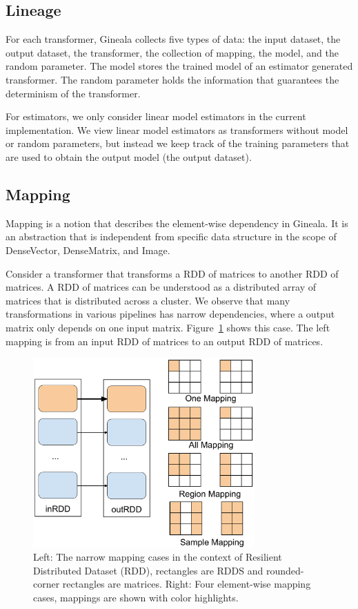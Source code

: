 \documentclass{sig-alternate}
\begin{document}
\subsection{Lineage}
\label{sec:Design-Lineage}
For each transformer, Gineala collects five types of data: the input dataset, the output dataset, the transformer, the collection of mapping, the model, and the random parameter.
The model stores the trained model of an estimator generated transformer.
The random parameter holds the information that guarantees the determinism of the transformer.

For estimators, we only consider linear model estimators in the current implementation. 
We view linear model estimators as transformers without model or random parameters, 
but instead we keep track of the training parameters that are used to obtain the output model (the output dataset). 

\subsection{Mapping}
Mapping is a notion that describes the element-wise dependency in Gineala. 
It is an abstraction that is independent from specific data structure in the scope of DenseVector, DenseMatrix, and Image.

Consider a transformer that transforms a RDD of matrices to another RDD of matrices.
A RDD of matrices can be understood as a distributed array of matrices that is distributed across a cluster.
We observe that many transformations in various pipelines has narrow dependencies, where a output matrix
only depends on one input matrix. Figure~\ref{fig:narrowmapping} shows this case. 
The left mapping is from an input RDD of matrices to an output RDD of matrices. 

\begin{figure}[h]
\begin{center}
    \includegraphics[width=85mm]{pictures/narrowmapping}
\caption {Left: The narrow mapping cases in the context of Resilient Distributed Dataset (RDD), rectangles are RDDS and rounded-corner rectangles are matrices.
Right: Four element-wise mapping cases, mappings are shown with color highlights.
    \label{fig:narrowmapping}
}
\end{center}
\end{figure}
\end{document}
